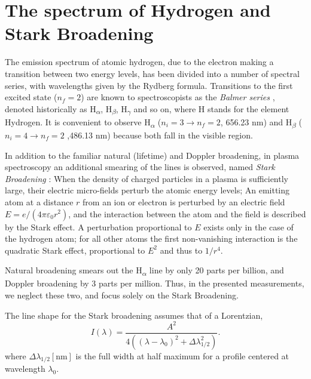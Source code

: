 \documentclass[justified,nofonts,nobib]{tufte-book}
\begin{document}
\section{The spectrum of Hydrogen and Stark Broadening}\label{sec:hydrogen}
The emission spectrum of atomic hydrogen, due to the electron making a transition between two energy levels, has been divided into a number of spectral series, with wavelengths given by the Rydberg formula. Transitions to the first excited state ($n_f=2$) are known to spectroscopists as the \textit{Balmer series} , denoted historically as H\textsubscript{$\alpha$}, H\textsubscript{$\beta$}, H\textsubscript{$\gamma$} and so on, where H stands for the element Hydrogen. It is convenient to observe H\textsubscript{$\alpha$} ($n_i=3 \to n_f=2$, 656.23 nm) and H\textsubscript{$\beta$} ($n_i=4 \to n_f=2$ ,486.13 nm) because both fall in the visible region.

In addition to the familiar natural (lifetime) and Doppler broadening, in plasma spectroscopy an additional smearing of the lines is observed, named \textit{Stark Broadening} : When the density of charged particles in a plasma is sufficiently large, their electric micro-fields perturb the atomic energy levels\cite{Griem1974}; An emitting atom at a distance $r$ from an ion or electron is perturbed by an electric field $E=e/(4\pi \varepsilon_0 r^2)$, and the interaction between the atom and the field is described by the Stark effect. A perturbation proportional to $E$ exists only in the case of the hydrogen atom; for all other atoms the first non-vanishing interaction is the quadratic Stark effect\cite{Thorne1988}, proportional to $E^2$ and thus to $1/r^4$.

Natural broadening smears out the H\textsubscript{$\alpha$} line by only 20 parts per billion, and Doppler broadening by 3 parts per million. Thus, in the presented measurements, we neglect these two, and focus solely on the Stark Broadening.

The line shape for the Stark broadening assumes that of a Lorentzian,
\begin{equation}
I\left( \lambda \right)=\frac{A^2}{4\left( \left(\lambda-\lambda_0\right)^2+\Delta \lambda_{1/2}^2\right)}. \label{eq:Stark_Broadening}
\end{equation}
where $\Delta \lambda_{1/2}\left[\si{\nm}\right]$ is the full width at half maximum for a profile centered at wavelength $\lambda_0$.
\end{document}
